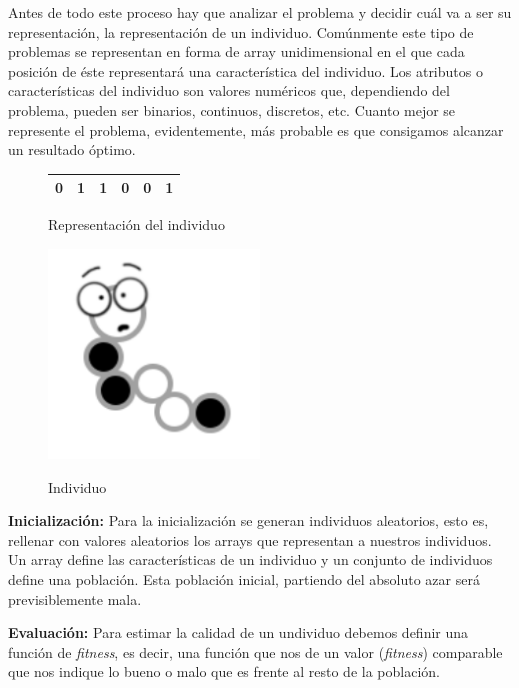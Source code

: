 Antes de todo este proceso hay que analizar el problema y decidir cuál va a ser su representación, la representación de un individuo. Comúnmente este tipo de problemas se representan en forma de array unidimensional en el que cada posición de éste representará una característica del individuo. Los atributos o características del individuo son valores numéricos que, dependiendo del problema, pueden ser binarios, continuos, discretos, etc. Cuanto mejor se represente el problema, evidentemente, más probable es que consigamos alcanzar un resultado óptimo. 

\begin{figure}[ht]
\begin{minipage}[b]{0.56\linewidth}
\centering
\begin{tabular}{|c|c|c|c|c|c|}
\hline
 0 & 1 & 1 & 0 & 0 & 1 \\ \hline
\end{tabular}
    \caption{Representación del individuo}
    \label{table:individuo}
\end{minipage}\hfill
\begin{minipage}[b]{0.4\linewidth}

\centering
  \includegraphics[width=0.5\textwidth]{../img/gusanete}\label{fig:f1}
  \caption{Individuo}
\end{minipage}
\end{figure}
    


\textbf{Inicialización:} Para la inicialización se generan individuos aleatorios, esto es, rellenar con valores aleatorios los arrays que representan a nuestros individuos. Un array define las características de un individuo y un conjunto de individuos define una población. Esta población inicial, partiendo del absoluto azar será previsiblemente mala.

\textbf{Evaluación:} Para estimar la calidad de un undividuo debemos definir una función de \emph{fitness}, es decir, una función que nos de un valor (\emph{fitness}) comparable que nos indique lo bueno o malo que es frente al resto de la población.

